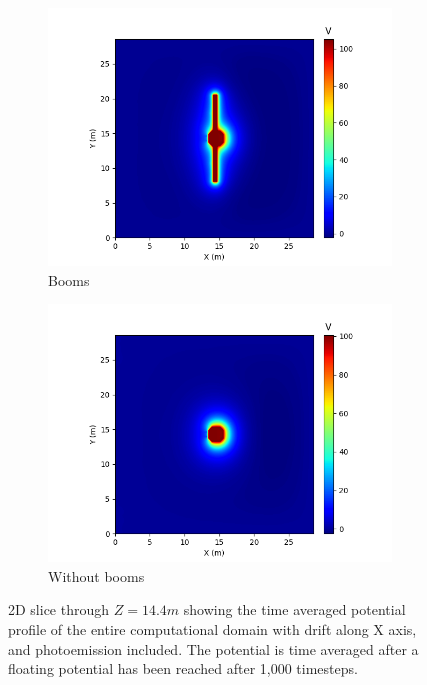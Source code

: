 
\begin{figure}[H]
  \begin{subfigure}[b]{0.6\textwidth}
    \includegraphics[width=\textwidth]{figures/MMO/posX/WB/P_posX_WB.png}
    \caption{Booms}
    \label{fig:P_posX_WB}
  \end{subfigure}
  \begin{subfigure}[b]{0.6\textwidth}
    \includegraphics[width=\textwidth]{figures/MMO/posX/NB/P_posX_NB.png}
    \caption{Without booms}
    \label{fig:P_posX_NB}
  \end{subfigure}
  \label{fig:Pot_posX}
  \caption{2D slice through $Z = 14.4 m$ showing the time averaged potential profile of the entire computational domain with drift along X axis, and photoemission included. The potential is time averaged after a floating potential has been reached after 1,000 timesteps.}
\end{figure}



